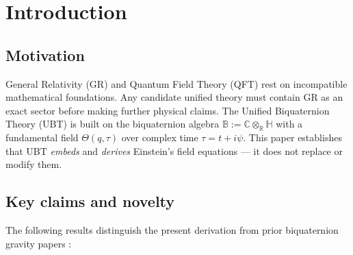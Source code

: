 \documentclass[12pt,a4paper]{article}
\theoremstyle{definition}
\theoremstyle{remark}
\begin{document}
\tableofcontents

\section{Introduction}
\label{sec:intro}

\subsection{Motivation}

General Relativity (GR) and Quantum Field Theory (QFT) rest on incompatible
mathematical foundations.  Any candidate unified theory must contain GR as an
exact sector before making further physical claims.  The Unified Biquaternion
Theory (UBT) is built on the biquaternion algebra
$\mathbb{B} := \mathbb{C}\otimes_{\mathbb{R}}\mathbb{H}$
with a fundamental field $\Theta(q,\tau)$ over complex time $\tau = t + i\psi$.
This paper establishes that UBT \emph{embeds} and \emph{derives} Einstein's
field equations — it does not replace or modify them.

\subsection{Key claims and novelty}

The following results distinguish the present derivation from prior biquaternion
gravity papers \cite{Adler1995,DeLeo1996,Finkelstein2001}:
\end{document}

